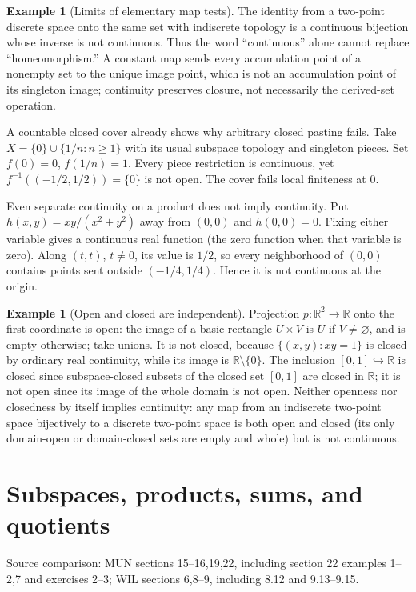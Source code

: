 \documentclass[11pt,oneside,openany]{book}
\theoremstyle{definition}
\newtheorem{example}[theorem]{Example}
\theoremstyle{remark}
\newcommand{\R}{\mathbb R}\newcommand{\C}{\mathbb C}
\newcommand{\source}[1]{\par\begingroup\small\sffamily\color{black!65}Source comparison: #1\par\endgroup}
\begin{document}
\begin{example}[Limits of elementary map tests]\label{d10:02:cautions}
The identity from a two-point discrete space onto the same set with indiscrete topology is a continuous bijection whose inverse is not continuous. Thus the word ``continuous'' alone cannot replace ``homeomorphism.'' A constant map sends every accumulation point of a nonempty set to the unique image point, which is not an accumulation point of its singleton image; continuity preserves closure, not necessarily the derived-set operation.

A countable closed cover already shows why arbitrary closed pasting fails. Take $X=\{0\}\cup\{1/n:n\ge1\}$ with its usual subspace topology and singleton pieces. Set $f(0)=0$, $f(1/n)=1$. Every piece restriction is continuous, yet $f^{-1}((-1/2,1/2))=\{0\}$ is not open. The cover fails local finiteness at $0$.

Even separate continuity on a product does not imply continuity. Put $h(x,y)=xy/(x^2+y^2)$ away from $(0,0)$ and $h(0,0)=0$. Fixing either variable gives a continuous real function (the zero function when that variable is zero). Along $(t,t)$, $t\ne0$, its value is $1/2$, so every neighborhood of $(0,0)$ contains points sent outside $(-1/4,1/4)$. Hence it is not continuous at the origin.
\end{example}

\begin{example}[Open and closed are independent]\label{d10:02:open-closed-examples}
Projection $p:\R^2\to\R$ onto the first coordinate is open: the image of a basic rectangle $U\times V$ is $U$ if $V\ne\varnothing$, and is empty otherwise; take unions. It is not closed, because $\{(x,y):xy=1\}$ is closed by ordinary real continuity, while its image is $\R\setminus\{0\}$. The inclusion $[0,1]\hookrightarrow\R$ is closed since subspace-closed subsets of the closed set $[0,1]$ are closed in $\R$; it is not open since its image of the whole domain is not open. Neither openness nor closedness by itself implies continuity: any map from an indiscrete two-point space bijectively to a discrete two-point space is both open and closed (its only domain-open or domain-closed sets are empty and whole) but is not continuous.
\end{example}



\chapter{Subspaces, products, sums, and quotients}\label{ch:d10-03}
\source{MUN sections 15--16,19,22, including section 22 examples 1--2,7 and exercises 2--3; WIL sections 6,8--9, including 8.12 and 9.13--9.15.}
\end{document}
